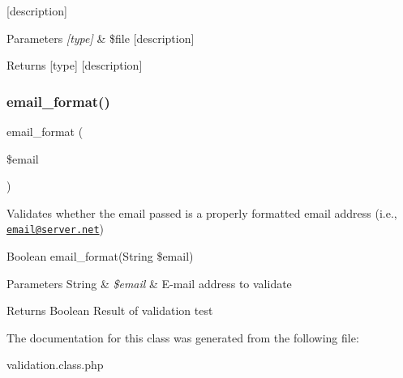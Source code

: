\mbox{[}description\mbox{]}


\begin{DoxyParams}{Parameters}
{\em \mbox{[}type\mbox{]}} & \$file \mbox{[}description\mbox{]} \\
\hline
\end{DoxyParams}
\begin{DoxyReturn}{Returns}
\mbox{[}type\mbox{]} \mbox{[}description\mbox{]} 
\end{DoxyReturn}
\mbox{\label{class_w_a_f_f_l_e_1_1_framework_1_1_i_o_1_1_validation_a93629f2b411f25d13fac77a36470fbae}} 
\subsubsection{\texorpdfstring{email\+\_\+format()}{email\_format()}}
{\footnotesize\ttfamily email\+\_\+format (\begin{DoxyParamCaption}\item[{}]{\$email }\end{DoxyParamCaption})}

Validates whether the email passed is a properly formatted email address (i.\+e., \href{mailto:email@server.net}{\tt email@server.\+net})

Boolean email\+\_\+format(String \$email)


\begin{DoxyParams}[1]{Parameters}
String & {\em \$email} & E-\/mail address to validate \\
\hline
\end{DoxyParams}
\begin{DoxyReturn}{Returns}
Boolean Result of validation test 
\end{DoxyReturn}


The documentation for this class was generated from the following file\+:\begin{DoxyCompactItemize}
\item 
validation.\+class.\+php\end{DoxyCompactItemize}
